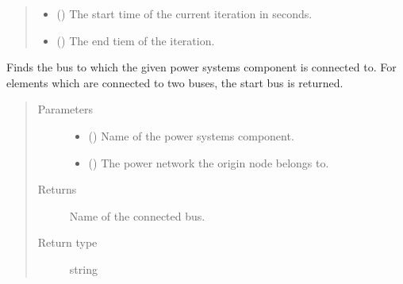 \documentclass[letterpaper,10pt,english]{sphinxmanual}
\begin{document}
\begin{fulllineitems}
\begin{fulllineitems}
\begin{quote}
\begin{description}
\begin{itemize}
\item {} 
\sphinxAtStartPar
{} () \textendash{} The start time of the current iteration in seconds.

\item {} 
\sphinxAtStartPar
{} () \textendash{} The end tiem of the iteration.

\end{itemize}

\end{description}\end{quote}

\end{fulllineitems}


\end{fulllineitems}


\begin{fulllineitems}
\label{\detokenize{apidoc:dreaminsg_integrated_model.src.network_sim_models.interdependencies.find_connected_power_node}}
\sphinxAtStartPar
Finds the bus to which the given power systems component is connected to. For elements which are connected to two buses, the start bus is returned.
\begin{quote}\begin{description}
\item[{Parameters}] \leavevmode\begin{itemize}
\item {} 
\sphinxAtStartPar
{} () \textendash{} Name of the power systems component.

\item {} 
\sphinxAtStartPar
{} () \textendash{} The power network the origin node belongs to.

\end{itemize}

\item[{Returns}] \leavevmode
\sphinxAtStartPar
Name of the connected bus.

\item[{Return type}] \leavevmode
\sphinxAtStartPar
string

\end{description}\end{quote}

\end{fulllineitems}
\end{document}
